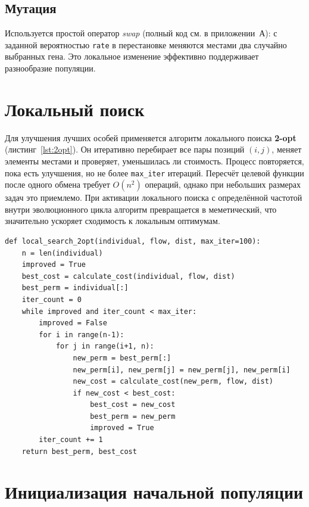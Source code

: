 \documentclass[732]{studrep}
\theoremstyle{nonumberplain}
\begin{document}
\subsection{Мутация}

Используется простой оператор \textit{swap} (полный код см. в приложении~А): с заданной вероятностью \texttt{rate} в перестановке меняются местами два случайно выбранных гена. Это локальное изменение эффективно поддерживает разнообразие популяции.

\section{Локальный поиск}
\label{sec:local_search}

Для улучшения лучших особей применяется алгоритм локального поиска \textbf{2-opt} (листинг~\ref{lst:2opt}). Он итеративно перебирает все пары позиций $(i,j)$, меняет элементы местами и проверяет, уменьшилась ли стоимость. Процесс повторяется, пока есть улучшения, но не более \texttt{max\_iter} итераций. Пересчёт целевой функции после одного обмена требует $O(n^2)$ операций, однако при небольших размерах задач это приемлемо. При активации локального поиска с определённой частотой внутри эволюционного цикла алгоритм превращается в меметический, что значительно ускоряет сходимость к локальным оптимумам.

\begin{listing}[H]
\begin{verbatim}
def local_search_2opt(individual, flow, dist, max_iter=100):
    n = len(individual)
    improved = True
    best_cost = calculate_cost(individual, flow, dist)
    best_perm = individual[:]
    iter_count = 0
    while improved and iter_count < max_iter:
        improved = False
        for i in range(n-1):
            for j in range(i+1, n):
                new_perm = best_perm[:]
                new_perm[i], new_perm[j] = new_perm[j], new_perm[i]
                new_cost = calculate_cost(new_perm, flow, dist)
                if new_cost < best_cost:
                    best_cost = new_cost
                    best_perm = new_perm
                    improved = True
        iter_count += 1
    return best_perm, best_cost
\end{verbatim}
\caption{Локальный поиск 2-opt.}
\label{lst:2opt}
\end{listing}

\section{Инициализация начальной популяции}
\label{sec:initialization}
\end{document}
